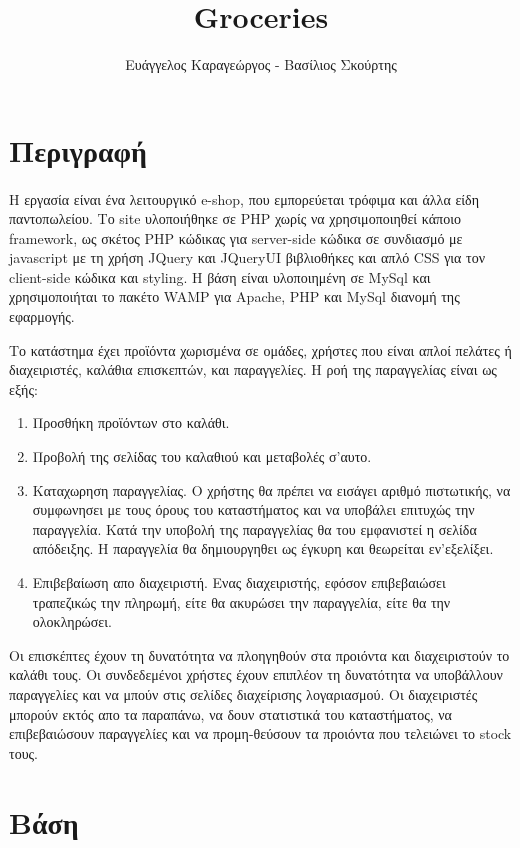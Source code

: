 \documentclass[12pt]{article}
\title{Groceries}
\author{Ευάγγελος Καραγεώργος - Βασίλιος Σκούρτης }
\date{}
\begin{document}
  \maketitle
  \section{Περιγραφή}
  	\paragraph{}
  	  Η εργασία είναι ένα λειτουργικό e-shop, που εμπορεύεται τρόφιμα και άλλα είδη παντοπωλείου. Το site υλοποιήθηκε σε PHP χωρίς να χρησιμοποιηθεί κάποιο framework, ως σκέτος PHP κώδικας για server-side κώδικα σε συνδιασμό με javascript με τη χρήση JQuery και JQueryUI βιβλιοθήκες και απλό CSS για τον client-side κώδικα και styling. Η βάση είναι υλοποιημένη σε MySql και χρησιμοποιήται το πακέτο WAMP για Apache, PHP και MySql διανομή της εφαρμογής.
  	  \par Το κατάστημα έχει προϊόντα χωρισμένα σε ομάδες, χρήστες που είναι απλοί πελάτες ή διαχειριστές, καλάθια επισκεπτών, και παραγγελίες. Η ροή της παραγγελίας είναι ως εξής:
  	  \begin{enumerate}
  	  	\item Προσθήκη προϊόντων στο καλάθι.
  	  	\item Προβολή της σελίδας του καλαθιού και μεταβολές σ'αυτο.
  	  	\item Καταχωρηση παραγγελίας. Ο χρήστης θα πρέπει να εισάγει αριθμό πιστωτικής, να συμφωνησει με τους όρους του καταστήματος και να υποβάλει επιτυχώς την παραγγελία. Κατά την υποβολή της παραγγελίας θα του εμφανιστεί η σελίδα απόδειξης. Η παραγγελία θα δημιουργηθει ως έγκυρη και θεωρείται εν'εξελίξει.
  	  	\item Επιβεβαίωση απο διαχειριστή. Ενας διαχειριστής, εφόσον επιβεβαιώσει τραπεζικώς την πληρωμή, είτε θα ακυρώσει την παραγγελία, είτε θα την ολοκληρώσει.
  	  \end{enumerate}
  	  \par Οι επισκέπτες έχουν τη δυνατότητα να πλοηγηθούν στα προιόντα και διαχειριστούν το καλάθι τους. Οι συνδεδεμένοι χρήστες έχουν επιπλέον τη δυνατότητα να υποβάλλουν παραγγελίες και να μπούν στις σελίδες διαχείρισης λογαριασμού. Οι διαχειριστές μπορούν εκτός απο τα παραπάνω, να δουν στατιστικά του καταστήματος, να επιβεβαιώσουν παραγγελίες και να προμη-θεύσουν τα προιόντα που τελειώνει το stock τους.
  \section{Βάση}
\end{document}
